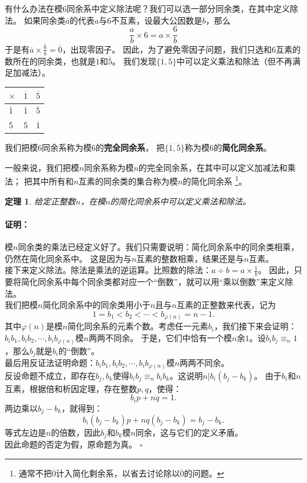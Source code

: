 \documentclass[12pt,UTF8]{ctexbook}
\newtheorem{tm}{定理}[section]
\newenvironment{proof2}{\paragraph{\textbf{证明：}}}{\hfill$\square$}
\begin{document}
有什么办法在模$6$同余系中定义除法呢？我们可以选一部分同余类，在其中定义除法。
如果同余类$\overline{a}$的代表$a$与$6$不互素，设最大公因数是$b$，那么
$$ \frac{a}{b} \times 6 = a \times \frac{6}{b} $$
于是有$\overline{a} \times \overline{\frac{6}{b}} = \overline{0}$，出现零因子。
因此，为了避免零因子问题，我们只选和$6$互素的数所在的同余类，也就是$\overline{1}$和$\overline{5}$。
我们发现$\{\overline{1}, \overline{5}\}$中可以定义乘法和除法（但不再满足加减法）。
\begin{center}
    \begin{tabular}{ | p{2em}<{\centering} | p{2em}<{\centering} | p{2em}<{\centering} | }
        \hline
            $\times$   & $\overline{1}$ & $\overline{5}$ \\ [0.5ex] 
        \hline
        $\overline{1}$ & $\overline{1}$ & $\overline{5}$ \\
        \hline
        $\overline{5}$ & $\overline{5}$ & $\overline{1}$ \\
        \hline
    \end{tabular}
\end{center}
我们把模$6$同余系称为模$6$的\textbf{完全同余系}，
把$\{\overline{1}, \overline{5}\}$称为模$6$的\textbf{简化同余系}。

一般来说，我们把模$n$同余系称为模$n$的完全同余系，在其中可以定义加减法和乘法；
把其中所有和$n$互素的同余类的集合称为模$n$的简化同余系
\footnote{通常不把$\overline{0}$计入简化剩余系，以省去讨论除以$\overline{0}$的问题。}。

\begin{tm}\label{tm:3-2-0}
    给定正整数$n$，在模$n$的简化同余系中可以定义乘法和除法。
\end{tm}
\begin{proof2}
    模$n$同余类的乘法已经定义好了。我们只需要说明：简化同余系中的同余类相乘，仍然在简化同余系中。
    这是因为与$n$互素的整数相乘，结果还是与$n$互素。\\
    接下来定义除法。除法是乘法的逆运算。比照数的除法：$a \div b = a \times \frac{1}{b}$。
    因此，只要将简化同余系中每个同余类都对应一个“倒数”，就可以用“乘以倒数”来定义除法。\\
    我们把模$n$简化同余系中的同余类用小于$n$且与$n$互素的正整数来代表，记为
    $$1 = b_1 < b_2 < \cdots < b_{\varphi(n)} = n-1.$$
    其中$\varphi(n)$是模$n$简化同余系的元素个数。考虑任一元素$b_i$，我们接下来会证明：
    $b_ib_1, b_ib_2, \cdots, b_ib_{\varphi(n)}$模$n$两两不同余。
    于是，它们中恰有一个模$n$余$1$。设$b_ib_j \equiv_n 1$，那么$b_j$就是$b_i$的“倒数”。\\
    最后用反证法证明命题：$b_ib_1, b_ib_2, \cdots, b_ib_{\varphi(n)}$模$n$两两不同余。\\
    反设命题不成立，即存在$b_j, b_k$使得$b_ib_j \equiv_n b_ib_k$。这说明$n | b_i(b_j - b_k)$。
    由于$b_i$和$n$互素，根据倍和析因定理，存在整数$p, q$，使得：
    $$ b_ip + nq = 1.$$
    两边乘以$b_j - b_k$，就得到：
    $$ b_i(b_j - b_k)p + nq(b_j - b_k) = b_j - b_k.$$
    等式左边是$n$的倍数，因此$b_j$和$b_k$模$n$同余，这与它们的定义矛盾。\\
    因此命题的否定为假，原命题为真。
\end{proof2}
\end{document}
